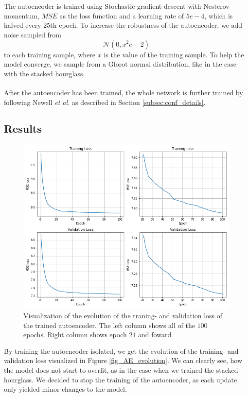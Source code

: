 \documentclass[./main.tex]{subfiles}
\begin{document}
\\
\\
The autoencoder is trained using Stochastic gradient descent with Nesterov momentum, $MSE$ as the loss function and a learning rate of $5e-4$, which is halved every $25$th epoch. To increase the robustness of the autoencoder, we add noise sampled from
$$\mathcal{N} \left(0, x^2e-2 \right)$$
to each training sample, where $x$ is the value of the training sample. To help the model converge, we sample from a Glorot normal distribution, like in the case with the stacked hourglass.
\\
\\
After the autoencoder has been trained, the whole network is further trained by following Newell \textit{et al.} \cite{Newell} as described in Section \ref{subsec:conf_details}.

\subsection{Results}
\begin{figure}
    \centering
    \includegraphics[height = 10 cm]{entities/AE_evolution.png}
    \caption{Visualization of the evolution of the traning- and validation loss of the trained autoencoder. The left column shows all of the $100$ epochs. Right column shows epoch $21$ and foward}
    \label{fig:AE_evolution}
\end{figure}
By training the autoencoder isolated, we get the evolution of the training- and validation loss visualized in Figure \ref{fig_AE_evolution}. We can clearly see, how the model does not start to overfit, as in the case when we trained the stacked hourglass. We decided to stop the training of the autoencoder, as each update only yielded minor changes to the model.
\\
\\


\end{document}
